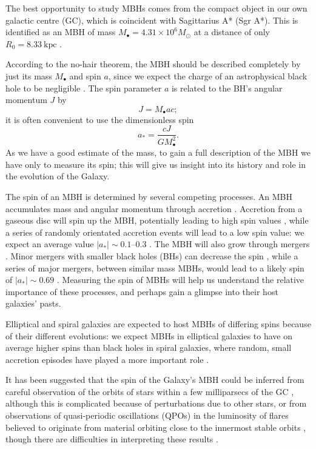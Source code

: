 \documentclass[useAMS,usedcolumn,usegraphicx,usenatbib]{mn2e}
\newcommand{\units}[1]{\ensuremath{~\mathrm{#1}}}
\begin{document}
The best opportunity to study MBHs comes from the compact object in our own galactic centre (GC), which is coincident with Sagittarius A* (Sgr A*). This is identified as an MBH of mass $M_\bullet = 4.31 \times 10^6 M_\odot$ at a distance of only $R_0 = 8.33\units{kpc}$ \citep{Gillessen2009}.

According to the no-hair theorem, the MBH should be described completely by just its mass $M_\bullet$ and spin $a$, since we expect the charge of an astrophysical black hole to be negligible \citep{Israel1967, Israel1968, Carter1971, Hawking1972, Robinson1975, Chandrasekhar1998}. The spin parameter $a$ is related to the BH's angular momentum $J$ by
\begin{equation}
J = M_\bullet ac;
\end{equation}
it is often convenient to use the dimensionless spin
\begin{equation}
a_\ast = \frac{cJ}{GM_\bullet^2}.
\end{equation}
As we have a good estimate of the mass, to gain a full description of the MBH we have only to measure its spin; this will give us insight into its history and role in the evolution of the Galaxy.

The spin of an MBH is determined by several competing processes. An MBH accumulates mass and angular momentum through accretion \citep{Volonteri2010}. Accretion from a gaseous disc will spin up the MBH, potentially leading to high spin values \citep{Volonteri2005}, while a series of randomly orientated accretion events will lead to a low spin value: we expect an average value $|a_\ast| \sim 0.1$--$0.3$ \citep*{King2006, King2008}. The MBH will also grow through mergers \citep{Yu2002, Malbon2007}. Minor mergers with smaller black holes (BHs) can decrease the spin \citep*{Hughes2003, Gammie2004}, while a series of major mergers, between similar mass MBHs, would lead to a likely spin of $|a_\ast| \sim 0.69$ \citep{Berti2008, Berti2007, Gonzalez2007}. Measuring the spin of MBHs will help us understand the relative importance of these processes, and perhaps gain a glimpse into their host galaxies' pasts.

Elliptical and spiral galaxies are expected to host MBHs of differing spins because of their different evolutions: we expect MBHs in elliptical galaxies to have on average higher spins than black holes in spiral galaxies, where random, small accretion episodes have played a more important role \citep*{Volonteri2007, Sikora2007}.

It has been suggested that the spin of the Galaxy's MBH could be inferred from careful observation of the orbits of stars within a few milliparsecs of the GC \citep{Merritt2010}, although this is complicated because of perturbations due to other stars, or from observations of quasi-periodic oscillations (QPOs) in the luminosity of flares believed to originate from material orbiting close to the innermost stable orbits \citep{Genzel2003a, Belanger2006, Trippe2007, Hamaus2009, Kato2010}, though there are difficulties in interpreting these results \citep{Psaltis2008a}.
\end{document}
